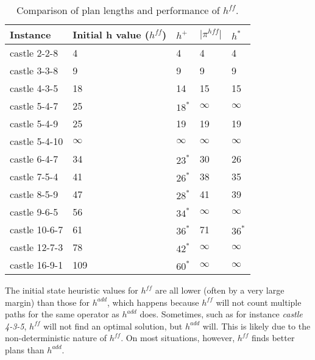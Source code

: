 \documentclass[11pt]{article}
\begin{document}
\begin{titlepage}
\begin{table}
    \centering
    \begin{tabular}{l|l|l|l|l}
        Instance & Initial h value ($h^{ff}$) & $h^+$  & $\lvert \pi^{hff} \rvert$ & $h^*$ \\
        \hline
        castle 2-2-8 & 4 & 4 & 4 & 4 \\
        castle 3-3-8 & 9 & 9  & 9 & 9 \\
        castle 4-3-5 & 18 & 14 & 15 & 15 \\
        castle 5-4-7 & 25 & $18^*$ & $\infty$ & $\infty$ \\
        castle 5-4-9 & 25 & 19 & 19 & 19 \\
        castle 5-4-10 & $\infty$ & $\infty$ & $\infty$ & $\infty$ \\
        castle 6-4-7 & 34 & $23^*$ & 30 & 26 \\
        castle 7-5-4 & 41 & $26^*$ & 38 & 35 \\
        castle 8-5-9 & 47 & $28^*$ & 41 & 39 \\
        castle 9-6-5 & 56 & $34^*$ & $\infty$ & $\infty$ \\
        castle 10-6-7 & 61 & $36^*$ & 71 & $36^*$ \\
        castle 12-7-3 & 78 & $42^*$ & $\infty$ & $\infty$ \\
        castle 16-9-1 & 109 & $60^*$ & $\infty$ & $\infty$ \\
    \end{tabular}
    \caption{Comparison of plan lengths and performance of $h^{ff}$.}
    \label{tab:experiment-ff}
\end{table}

The initial state heuristic values for $h^{ff}$ are all lower (often by a very large margin) than
those for $h^{add}$, which happens because $h^{ff}$ will not count multiple paths for the same
operator as $h^{add}$ does. Sometimes, such as for instance \textit{castle 4-3-5}, $h^{ff}$ will not
find an optimal solution, but $h^{add}$ will. This is likely due to the non-deterministic nature
of $h^{ff}$. On most situations, however, $h^{ff}$ finds better plans than $h^{add}$.

\end{titlepage}
\end{document}
